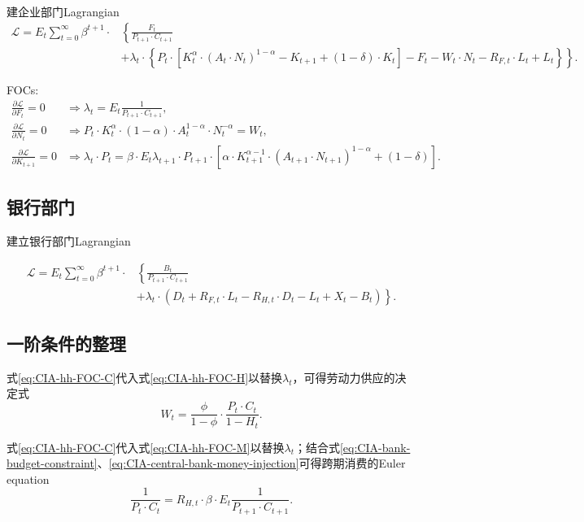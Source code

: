建企业部门Lagrangian
\begin{align*}
  \mathcal{L} = E_t \sum_{t=0}^{\infty} \beta^{t+1} \cdot &\left\{ \frac{F_t}{P_{t+1} \cdot C_{t+1}} \right. \\
  &+\left. \lambda_t \cdot \left\{
P_t \cdot \left[ K_t^{\alpha} \cdot \left( A_t \cdot N_t \right)^{1-\alpha} - K_{t+1} + (1-\delta) \cdot K_t \right] - F_t - W_t \cdot N_t - R_{F,t} \cdot L_t + L_t
  \right\} \right\}.
\end{align*}

FOCs:
\begin{align}
  \label{eq:CIA-firm-FOC-F}
  \frac{\partial \mathcal{L}}{\partial F_t} = 0 & \Rightarrow \lambda_t = E_t \frac{1}{P_{t+1} \cdot C_{t+1}}, \\
  \label{eq:CIA-firm-FOC-N}
  \frac{\partial \mathcal{L}}{\partial N_t} = 0 & \Rightarrow P_t \cdot K_{t}^{\alpha} \cdot (1-\alpha) \cdot A_t^{1-\alpha} \cdot N_t^{-\alpha} = W_t,\\
  \label{eq:CIA-firm-FOC-K}
  \frac{\partial \mathcal{L}}{\partial K_{t+1}} = 0 &\Rightarrow \lambda_t \cdot P_t = \beta \cdot E_t \lambda_{t+1} \cdot P_{t+1} \cdot \left[
\alpha \cdot K_{t+1}^{\alpha - 1} \cdot \left( A_{t+1} \cdot N_{t+1} \right)^{1-\alpha} + (1-\delta)
  \right].
\end{align}

\subsection{银行部门}
建立银行部门Lagrangian

\begin{align*}
  \mathcal{L} = E_t \sum_{t=0}^{\infty} \beta^{t+1} \cdot & \left\{ \frac{B_t}{P_{t+1} \cdot C_{t+1}} \right. \\
  &\left.
  + \lambda_t \cdot \left(D_t + R_{F,t} \cdot L_t - R_{H,t} \cdot D_t - L_t + X_t - B_t \right)
  \right\}.
\end{align*}

\subsection{一阶条件的整理}
式\eqref{eq:CIA-hh-FOC-C}代入式\eqref{eq:CIA-hh-FOC-H}以替换$\lambda_t$，可得劳动力供应的决定式
\begin{equation}
  \label{eq:CIA-FOC-labor-supply}
  W_t = \frac{\phi}{1-\phi} \cdot \frac{P_t \cdot C_t}{1-H_t}.
\end{equation}

式\eqref{eq:CIA-hh-FOC-C}代入式\eqref{eq:CIA-hh-FOC-M}以替换$\lambda_t$；结合式\eqref{eq:CIA-bank-budget-constraint}、\eqref{eq:CIA-central-bank-money-injection}可得跨期消费的Euler equation
\begin{equation}
  \label{eq:CIA-FOC-intertemp-consumption-euler}
  \frac{1}{P_t \cdot C_t} = R_{H,t} \cdot \beta \cdot E_t \frac{1}{P_{t+1} \cdot C_{t+1}}.
\end{equation}


